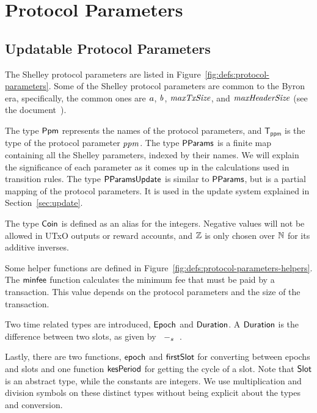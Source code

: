 \section{Protocol Parameters}
\label{sec:protocol-parameters}

\subsection{Updatable Protocol Parameters}
\label{sec:updatable-protocol-parameters}

The Shelley protocol parameters are listed in Figure~\ref{fig:defs:protocol-parameters}.
Some of the Shelley protocol parameters are common to the Byron era,
specifically, the common ones are $\mathit{a}$, $\mathit{b}$, $\mathit{maxTxSize}$, and
$\mathit{maxHeaderSize}$ (see the document~\cite{byron_ledger_spec}).

The type $\mathsf{Ppm}$ represents the names of the protocol parameters,
and $\mathsf{T_{ppm}}$ is the type of the protocol parameter $\mathit{ppm}$.
The type $\mathsf{PParams}$ is a finite map containing all the Shelley parameters,
indexed by their names.
We will explain the significance of each parameter as it comes up in
the calculations used in transition rules.
The type $\mathsf{PParamsUpdate}$ is similar to $\mathsf{PParams}$, but is
a partial mapping of the protocol parameters. It is used in the update
system explained in Section~\ref{sec:update}.

The type $\mathsf{Coin}$ is defined as an alias for the integers.
Negative values will not be allowed in UTxO outputs or reward accounts,
and $\mathbb{Z}$ is only chosen over $\mathbb{N}$ for its additive inverses.

Some helper functions are defined in Figure~\ref{fig:defs:protocol-parameters-helpers}.
The $\mathsf{minfee}$ function calculates the minimum fee that must be paid by a transaction.
This value depends on the protocol parameters and the size of the transaction.

Two time related types are introduced, $\mathsf{Epoch}$ and $\mathsf{Duration}$.
A $\mathsf{Duration}$ is the difference between two slots, as given by $\mathit{}~-_{s}~\mathit{}$.

Lastly, there are two functions, $\mathsf{epoch}$ and $\mathsf{firstSlot}$ for converting
between epochs and slots and one function $\mathsf{kesPeriod}$ for getting the cycle of a slot.
Note that $\mathsf{Slot}$ is an abstract type, while the constants are integers.
We use multiplication and division symbols on these distinct types
without being explicit about the types and conversion.

